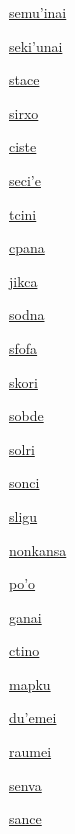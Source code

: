 {\hyperlink{val:semuhinai}{semu'inai}}{}{}{}

{\hyperlink{val:sekihunai}{seki'unai}}{}{}{}

{\hyperlink{val:stace}{stace}}{}{}{}

{\hyperlink{val:sirxo}{sirxo}}{}{}{}

{\hyperlink{val:ciste}{ciste}}{}{}{}

{\hyperlink{val:secihe}{seci'e}}{}{}{}

{\hyperlink{val:tcini}{tcini}}{}{}{}

{\hyperlink{val:cpana}{cpana}}{}{}{}

{\hyperlink{val:jikca}{jikca}}{}{}{}

{\hyperlink{val:sodna}{sodna}}{}{}{}

{\hyperlink{val:sfofa}{sfofa}}{}{}{}

{\hyperlink{val:skori}{skori}}{}{}{}

{\hyperlink{val:sobde}{sobde}}{}{}{}

{\hyperlink{val:solri}{solri}}{}{}{}

{\hyperlink{val:sonci}{sonci}}{}{}{}

{\hyperlink{val:sligu}{sligu}}{}{}{}

{\hyperlink{val:nonkansa}{nonkansa}}{}{}{}

{\hyperlink{val:poho}{po'o}}{}{}{}

{\hyperlink{val:ganai}{ganai}}{}{}{}

{\hyperlink{val:ctino}{ctino}}{}{}{}

{\hyperlink{val:mapku}{mapku}}{}{}{}

{\hyperlink{val:duhemei}{du'emei}}{}{}{}

{\hyperlink{val:raumei}{raumei}}{}{}{}

{\hyperlink{val:senva}{senva}}{}{}{}

{\hyperlink{val:sance}{sance}}{}{}{}

